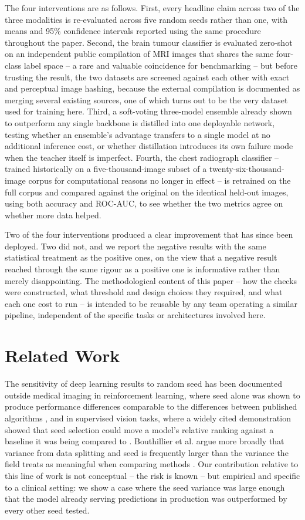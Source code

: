 \documentclass[conference]{IEEEtran}
\begin{document}
The four interventions are as follows. First, every headline claim across two of the three modalities is re-evaluated across five random seeds rather than one, with means and 95\% confidence intervals reported using the same procedure throughout the paper. Second, the brain tumour classifier is evaluated zero-shot on an independent public compilation of MRI images that shares the same four-class label space -- a rare and valuable coincidence for benchmarking -- but before trusting the result, the two datasets are screened against each other with exact and perceptual image hashing, because the external compilation is documented as merging several existing sources, one of which turns out to be the very dataset used for training here. Third, a soft-voting three-model ensemble already shown to outperform any single backbone is distilled into one deployable network, testing whether an ensemble's advantage transfers to a single model at no additional inference cost, or whether distillation introduces its own failure mode when the teacher itself is imperfect. Fourth, the chest radiograph classifier -- trained historically on a five-thousand-image subset of a twenty-six-thousand-image corpus for computational reasons no longer in effect -- is retrained on the full corpus and compared against the original on the identical held-out images, using both accuracy and ROC-AUC, to see whether the two metrics agree on whether more data helped.

Two of the four interventions produced a clear improvement that has since been deployed. Two did not, and we report the negative results with the same statistical treatment as the positive ones, on the view that a negative result reached through the same rigour as a positive one is informative rather than merely disappointing. The methodological content of this paper -- how the checks were constructed, what threshold and design choices they required, and what each one cost to run -- is intended to be reusable by any team operating a similar pipeline, independent of the specific tasks or architectures involved here.

\section{Related Work}

The sensitivity of deep learning results to random seed has been documented outside medical imaging in reinforcement learning, where seed alone was shown to produce performance differences comparable to the differences between published algorithms \cite{henderson2018}, and in supervised vision tasks, where a widely cited demonstration showed that seed selection could move a model's relative ranking against a baseline it was being compared to \cite{picard2021}. Bouthillier et al. argue more broadly that variance from data splitting and seed is frequently larger than the variance the field treats as meaningful when comparing methods \cite{bouthillier2021}. Our contribution relative to this line of work is not conceptual -- the risk is known -- but empirical and specific to a clinical setting: we show a case where the seed variance was large enough that the model already serving predictions in production was outperformed by every other seed tested.
\end{document}
